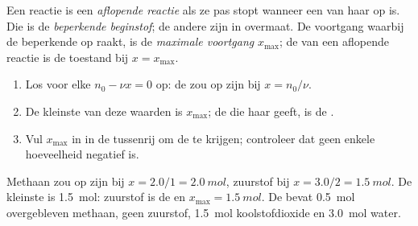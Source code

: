 \begin{definition}\label{def:g10:reaction-progress-table:limiting}
Een reactie is een \emph{aflopende reactie} als
ze pas stopt wanneer een van haar  op is. Die  is
de \emph{beperkende beginstof}; de andere
 zijn in overmaat. De voortgang waarbij de beperkende
 op raakt, is de \emph{maximale voortgang}
$x_{\max}$; de  van een aflopende reactie is de toestand bij
$x = x_{\max}$.
\end{definition}

\begin{method}\label{met:g10:reaction-progress-table:limiting}
\begin{enumerate}
  \item Los voor elke  $n_0 - \nu x = 0$ op: de  zou op
        zijn bij $x = n_0 / \nu$.
  \item De kleinste van deze waarden is $x_{\max}$; de  die haar
        geeft, is de .
  \item Vul $x_{\max}$ in in de tussenrij om de  te krijgen;
        controleer dat geen enkele hoeveelheid negatief is.
\end{enumerate}
\end{method}

\begin{example}\label{ex:g10:reaction-progress-table:methane-final}
Methaan zou op zijn bij $x = 2.0/1 = \qty{2.0}{mol}$, zuurstof bij
$x = 3.0/2 = \qty{1.5}{mol}$. De kleinste is \qty{1.5}{mol}: zuurstof is
de  en $x_{\max} = \qty{1.5}{mol}$. De 
bevat \qty{0.5}{mol} overgebleven methaan, geen zuurstof,
\qty{1.5}{mol} koolstofdioxide en \qty{3.0}{mol} water.
\end{example}

